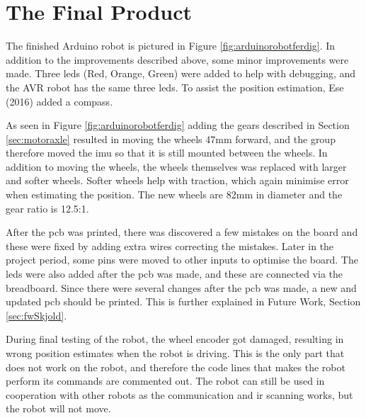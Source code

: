 \newpage
\section{The Final Product}
\label{sec:finardu}
The finished Arduino robot is pictured in Figure \ref{fig:arduinorobotferdig}. In addition to the improvements described above, some minor improvements were made. Three \acrshort{led}s (Red, Orange, Green) were added to help with debugging, and the AVR robot has the same three \acrshort{led}s. To assist the position estimation, Ese (2016) added a compass.

As seen in Figure \ref{fig:arduinorobotferdig} adding the gears described in Section \ref{sec:motoraxle} resulted in moving the wheels 47mm forward, and the group therefore moved the \acrshort{imu} so that it is still mounted between the wheels. In addition to moving the wheels, the wheels themselves was replaced with larger and softer wheels. Softer wheels help with traction, which again minimise error when estimating the position. The new wheels are 82mm in diameter and the gear ratio is 12.5:1.

After the \acrshort{pcb} was printed, there was discovered a few mistakes on the board and these were fixed by adding extra wires correcting the mistakes. Later in the project period, some pins were moved to other inputs to optimise the board. The \acrshort{led}s were also added after the \acrshort{pcb} was made, and these are connected via the breadboard. Since there were several changes after the \acrshort{pcb} was made, a new and updated \acrshort{pcb} should be printed. This is further explained in Future Work, Section \ref{sec:fwSkjold}.

During final testing of the robot, the wheel encoder got damaged, resulting in wrong position estimates when the robot is driving. This is the only part that does not work on the robot, and therefore the code lines that makes the robot perform its commands are commented out. The robot can still be used in cooperation with other robots as the communication and \acrshort{ir} scanning works, but the robot will not move.
\vspace*{20pt}
